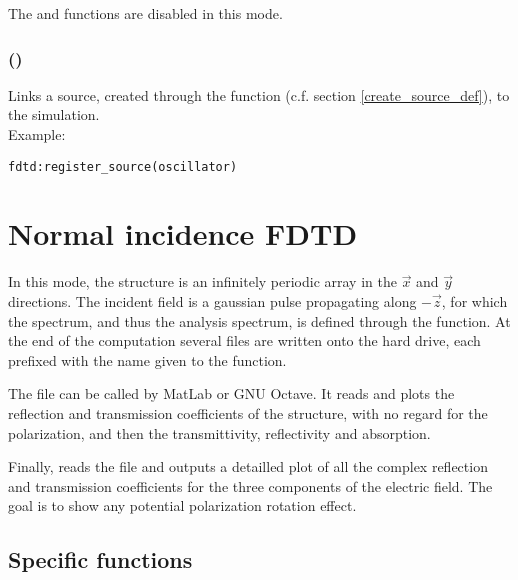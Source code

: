 The  and  functions are disabled in this mode.

\subsubsection[register\_source]{()}

Links a source, created through the  function (c.f. section \ref{create_source_def}), to the simulation. \\ Example:

\begin{lstlisting}
fdtd:register_source(oscillator)
\end{lstlisting}

\section{Normal incidence FDTD}

In this mode, the structure is an infinitely periodic array in the $\vec x$ and $\vec y$ directions. The incident field is a gaussian pulse propagating along $-\vec z$, for which the spectrum, and thus the analysis spectrum, is defined through the  function. At the end of the computation several files are written onto the hard drive, each prefixed with the name given to the  function.
	
	The  file can be called by MatLab or GNU Octave. It reads  and plots the reflection and transmission coefficients of the structure, with no regard for the polarization, and then the transmittivity, reflectivity and absorption.
	
	Finally,  reads the  file and outputs a detailled plot of all the complex reflection and transmission coefficients for the three components of the electric field. The goal is to show any potential polarization rotation effect.

\subsection{Specific functions}

%

